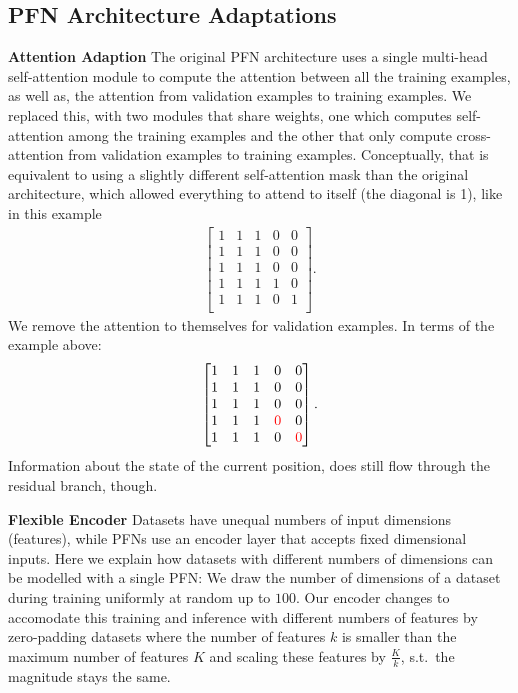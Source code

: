 \documentclass{article}
\begin{document}
\subsection{PFN Architecture Adaptations}
\label{app:pfn architecture change}
\textbf{Attention Adaption}
The original PFN architecture \citep{muller-iclr22a} uses a single multi-head self-attention module \citep{vaswani-neurips17a} to compute the attention between all the training examples, as well as, the attention from validation examples to training examples.
We replaced this, with two modules that share weights, one which computes self-attention among the training examples and the other that only compute cross-attention from validation examples to training examples.
Conceptually, that is equivalent to using a slightly different self-attention mask than the original architecture, which allowed everything to attend to itself (the diagonal is 1), like in this example
\begin{align}
\begin{bmatrix}
1& 1& 1& 0& 0\\
1& 1& 1& 0& 0\\
1& 1& 1& 0& 0\\
1& 1& 1& 1& 0\\
1& 1& 1& 0& 1\\
\end{bmatrix}.
\end{align}
We remove the attention to themselves for validation examples. In terms of the example above:
\begin{align}
\begin{bmatrix}
1& 1& 1& 0& 0\\
1& 1& 1& 0& 0\\
1& 1& 1& 0& 0\\
1& 1& 1& \textcolor{red}{0}& 0\\
1& 1& 1& 0& \textcolor{red}{0}\\
\end{bmatrix}.
\end{align}
Information about the state of the current position, does still flow through the residual branch, though.

\textbf{Flexible Encoder}
Datasets have unequal numbers of input dimensions (features), while PFNs use an encoder layer that accepts fixed dimensional inputs. Here we explain how datasets with different numbers of dimensions can be modelled with a single PFN:
We draw the number of dimensions of a dataset during training uniformly at random up to $100$.
Our encoder changes to accomodate this training and inference with different numbers of features by zero-padding datasets where
the number of features $k$ is smaller than the maximum number of features $K$ and scaling these features by $\frac{K}{k}$, s.t.\ the magnitude stays the same.
\end{document}
